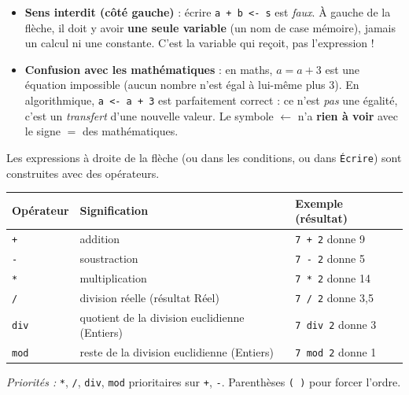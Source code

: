 \documentclass[11pt]{article}
\newcommand{\cle}[1]{{\popxbold\color{popdark}#1}}
\newcounter{popsec}
\newcounter{popsub}
\newcommand{\courssub}[1]{%
  \stepcounter{popsub}%
  \par\vspace{9pt}\noindent{\popxbold\fontsize{11.5}{13}\selectfont\color{popink}{\color{poporange}\thepopsec.\thepopsub}\hspace{6pt}#1}\par\nopagebreak\vspace{4pt}
}
\begin{document}
\begin{attention}
\begin{itemize}
\item \textbf{Sens interdit (côté gauche)} : écrire \texttt{a + b <- s} est \emph{faux}. À gauche de la flèche, il doit y avoir \textbf{une seule variable} (un nom de case mémoire), jamais un calcul ni une constante. C'est la variable qui reçoit, pas l'expression !
\item \textbf{Confusion avec les mathématiques} : en maths, $a = a + 3$ est une équation impossible (aucun nombre n'est égal à lui-même plus 3). En algorithmique, \texttt{a <- a + 3} est parfaitement correct : ce n'est \emph{pas} une égalité, c'est un \emph{transfert} d'une nouvelle valeur. Le symbole $\leftarrow$ n'a \textbf{rien à voir} avec le signe $=$ des mathématiques.
\end{itemize}
\end{attention}

\courssub{Les opérateurs}

Les expressions à droite de la flèche (ou dans les conditions, ou dans \texttt{Écrire}) sont construites avec des \cle{opérateurs}.

\begin{propriete}
\begin{center}
\begin{tabularx}{\linewidth}{|l|X|l|}\hline
\rowcolor{popblueL} \textbf{Opérateur} & \textbf{Signification} & \textbf{Exemple (résultat)} \\ \hline
\texttt{+} & addition & \texttt{7 + 2} donne 9 \\ \hline
\texttt{-} & soustraction & \texttt{7 - 2} donne 5 \\ \hline
\texttt{*} & multiplication & \texttt{7 * 2} donne 14 \\ \hline
\texttt{/} & division réelle (résultat Réel) & \texttt{7 / 2} donne 3,5 \\ \hline
\texttt{div} & quotient de la division euclidienne (Entiers) & \texttt{7 div 2} donne 3 \\ \hline
\texttt{mod} & reste de la division euclidienne (Entiers) & \texttt{7 mod 2} donne 1 \\ \hline
\end{tabularx}
\end{center}
\emph{Priorités :} \texttt{*}, \texttt{/}, \texttt{div}, \texttt{mod} prioritaires sur \texttt{+}, \texttt{-}. Parenthèses \texttt{( )} pour forcer l'ordre.
\end{propriete}
\end{document}
